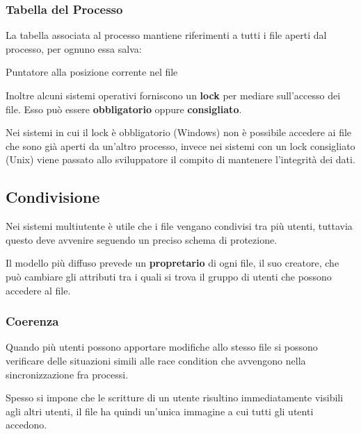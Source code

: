 \subsubsection{Tabella del Processo}
La tabella associata al processo mantiene riferimenti a tutti i file aperti dal processo, per ognuno essa salva:

\begin{sitemize}
    \item Puntatore alla posizione corrente nel file
\end{sitemize}

\spacer
Inoltre alcuni sistemi operativi forniscono un \textbf{lock} per mediare sull'accesso dei file.
Esso può essere \textbf{obbligatorio} oppure \textbf{consigliato}.

Nei sistemi in cui il lock è obbligatorio (Windows) non è possibile accedere ai file che sono già aperti da un'altro processo, invece nei sistemi con un lock consigliato (Unix) viene passato allo sviluppatore il compito di mantenere l'integrità dei dati.

\subsection{Condivisione}
Nei sistemi multiutente è utile che i file vengano condivisi tra più utenti, tuttavia questo deve avvenire seguendo un preciso schema di protezione.

\spacer
Il modello più diffuso prevede un \textbf{propretario} di ogni file, il suo creatore, che può cambiare gli attributi tra i quali si trova il gruppo di utenti che possono accedere al file.

\subsubsection{Coerenza}
Quando più utenti possono apportare modifiche allo stesso file si possono verificare delle situazioni simili alle race condition che avvengono nella sincronizzazione fra processi.

Spesso si impone che le scritture di un utente risultino immediatamente visibili agli altri utenti, il file ha quindi un'unica immagine a cui tutti gli utenti accedono.
